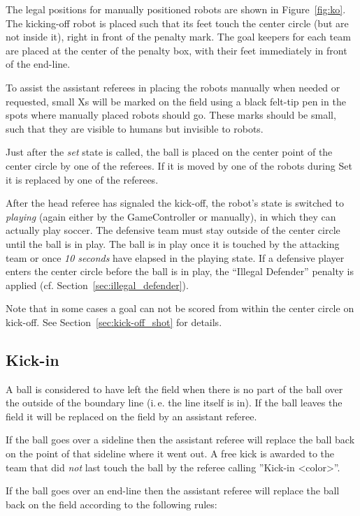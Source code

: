 \documentclass[12pt]{article}
\newcommand{\ie}{\mbox{i.\,e.}\xspace}
\newcommand{\cf}{\mbox{cf.}\xspace}
\begin{document}
The legal positions for manually positioned robots are shown in Figure~\ref{fig:ko}. The kicking-off robot is placed such that its feet touch the center circle (but are not inside it), right in front of the penalty mark. The goal keepers for each team are placed at the center of the penalty box, with their feet immediately in front of the end-line.

To assist the assistant referees in placing the robots manually when needed or requested, small Xs will be marked on the field using a black felt-tip pen in the spots where manually placed robots should go.  These marks should be small, such that they are visible to humans but invisible to robots.

Just after the \emph{set} state is called, the ball is placed on the center point of the center circle by one of the referees. If it is moved by one of the robots during Set it is replaced by one of the referees.

After the head referee has signaled the kick-off, the robot's state is switched to \emph{playing} (again either by the GameController or manually), in which they can actually play soccer.
The defensive team must stay outside of the center circle until the ball is in play.  The ball is in play once it is touched by the attacking team or once \emph{10 seconds} have elapsed in the playing state. If a defensive player enters the center circle before the ball is in play, the ``Illegal Defender'' penalty is applied (\cf Section~\ref{sec:illegal_defender}).

Note that in some cases a goal can not be scored from within the center circle on kick-off. See Section~\ref{sec:kick-off_shot} for details.

\subsection{Kick-in}
\label{sec:kick_in}

A ball is considered to have left the field when there is no part of the ball over the outside of the boundary line (\ie the line itself is in). If the ball leaves the field it will be replaced on the field by an assistant referee.

If the ball goes over a sideline then the assistant referee will replace the ball back on the point of that sideline where it went out. A free kick is awarded to the team that did \emph{not} last touch the ball by the referee calling ''Kick-in \textless color\textgreater''.

If the ball goes over an end-line then the assistant referee will replace the ball back on the field according to the following rules:
\end{document}
